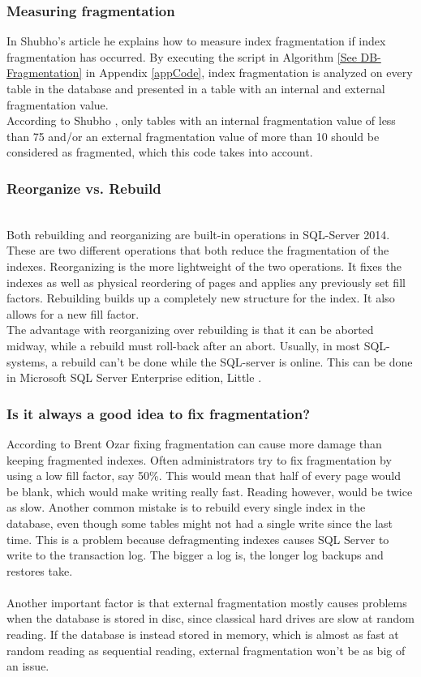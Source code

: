 \documentclass{cslthse-msc}
\begin{document}
\subsubsection{Measuring fragmentation} \label{measurefrag}
In Shubho's article \cite{Shubho09} he explains how to measure index fragmentation if index fragmentation has occurred. By executing the script in Algorithm \ref{See DB-Fragmentation} in Appendix \ref{appCode}, index fragmentation is analyzed on every table in the database and presented in a table with an internal and external fragmentation value. \\

\noindent According to Shubho \cite{Shubho09}, only tables with an internal fragmentation value of less than 75 and/or an external fragmentation value of more than 10 should be considered as fragmented, which this code takes into account.

\subsubsection{Reorganize vs. Rebuild}\mbox{}\\
Both rebuilding and reorganizing are built-in operations in SQL-Server 2014. These are two different operations that both reduce the fragmentation of the indexes. Reorganizing is the more lightweight of the two operations. It fixes the indexes as well as physical reordering of pages and applies any previously set fill factors. Rebuilding builds up a completely new structure for the index. It also allows for a new fill factor.\\
The advantage with reorganizing over rebuilding is that it can be aborted midway, while a rebuild must roll-back after an abort. Usually, in most SQL-systems, a rebuild can't be done while the SQL-server is online. This can be done in Microsoft SQL Server Enterprise edition, Little \cite{Little13}.

\subsubsection{Is it always a good idea to fix fragmentation?}
According to Brent Ozar   \cite{Ozar12} fixing fragmentation can cause more damage than keeping fragmented indexes. Often administrators try to fix fragmentation by using a low fill factor, say 50\%. This would mean that half of every page would be blank, which would make writing really fast. Reading however, would be twice as slow. Another common mistake is to rebuild every single index in the database, even though some tables might not had a single write since the last time. This is a problem because defragmenting indexes causes SQL Server to write to the transaction log. The bigger a log is, the longer log backups and restores take.\\\\
Another important factor is that external fragmentation mostly causes problems when the database is stored in disc, since classical hard drives are slow at random reading. If the database is instead stored in memory, which is almost as fast at random reading as sequential reading, external fragmentation won't be as big of an issue.
\end{document}
